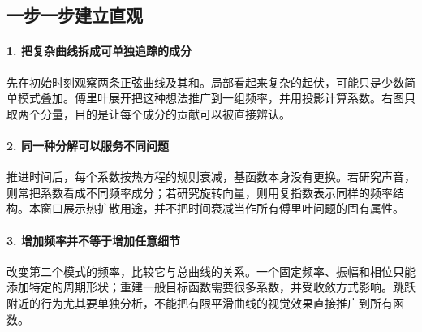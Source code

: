 \subsection*{一步一步建立直观}

\paragraph{1. 把复杂曲线拆成可单独追踪的成分}

先在初始时刻观察两条正弦曲线及其和。局部看起来复杂的起伏，可能只是少数简单模式叠加。傅里叶展开把这种想法推广到一组频率，并用投影计算系数。右图只取两个分量，目的是让每个成分的贡献可以被直接辨认。



\paragraph{2. 同一种分解可以服务不同问题}

推进时间后，每个系数按热方程的规则衰减，基函数本身没有更换。若研究声音，则常把系数看成不同频率成分；若研究旋转向量，则用复指数表示同样的频率结构。本窗口展示热扩散用途，并不把时间衰减当作所有傅里叶问题的固有属性。



\paragraph{3. 增加频率并不等于增加任意细节}

改变第二个模式的频率，比较它与总曲线的关系。一个固定频率、振幅和相位只能添加特定的周期形状；重建一般目标函数需要很多系数，并受收敛方式影响。跳跃附近的行为尤其要单独分析，不能把有限平滑曲线的视觉效果直接推广到所有函数。
